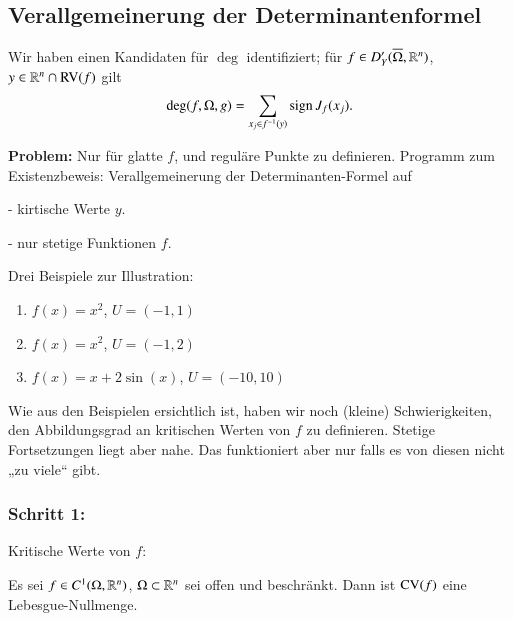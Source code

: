 \subsection{Verallgemeinerung der Determinantenformel}

Wir haben einen Kandidaten für $\deg$ identifiziert; für $f\in D'_Y(\overline\Omega,\mathbb{R}^n)$, $y\in \mathbb{R}^n\cap
\mathrm{RV}(f)$ gilt
\[
    \deg(f,\Omega, g)=\sum_{x_j\in f^{-1}(y)} \mathrm{sign}\, J_f(x_j).
\]

\noindent \textbf{Problem:} Nur für glatte $f$, und reguläre Punkte zu definieren. Programm zum 
Existenzbeweis: Verallgemeinerung der Determinanten-Formel auf
\begin{description}
    \item{-} kirtische Werte $y$.
    \item{-} nur stetige Funktionen $f$.
\end{description}

\noindent Drei Beispiele zur Illustration:
\begin{enumerate}
    \item $f(x)=x^2$, $U=(-1,1)$
    \item $f(x)=x^2$, $U=(-1,2)$
    \item $f(x)=x+2\sin(x)$, $U=(-10,10)$
\end{enumerate}
Wie aus den Beispielen ersichtlich ist, haben wir noch (kleine) Schwierigkeiten, den Abbildungsgrad
an kritischen Werten von $f$ zu definieren. Stetige Fortsetzungen liegt aber nahe. Das funktioniert
aber nur falls es von diesen nicht „zu viele“ gibt.

\subsubsection*{Schritt 1:} Kritische Werte von $f$:

\begin{lem}[Sard]\label{2.5}

Es sei $f\in C^1(\Omega, \mathbb{R}^n)$, $\Omega\subset\mathbb{R}^n$ sei offen und beschränkt. Dann ist
$\mathrm{CV}(f)$ eine Lebesgue-Nullmenge.
\end{lem}
    
